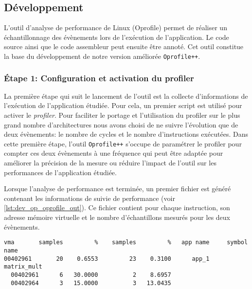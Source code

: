 \subsection{Développement}

    L'outil d'analyse de performance de Linux (Oprofile) permet de réaliser un échantillonnage des évènements lors de l'exécution de l'application. Le code source ainsi que le code assembleur peut ensuite être annoté. Cet outil constitue la base du développement de notre version améliorée \verb=Oprofile++=.
    
    \subsubsection{Étape 1: Configuration et activation du profiler}
        
        La première étape qui suit le lancement de l'outil est la collecte d'informations de l'exécution de l'application étudiée. Pour cela, un premier script est utilisé pour activer le \textit{profiler}. Pour faciliter le portage et l'utilisation du profiler sur le plus grand nombre d'architectures nous avons choisi de ne suivre l'évolution que de deux évènements: le nombre de cycles et le nombre d'instructions exécutées. Dans cette première étape, l'outil \verb=Oprofile++= s'occupe de paramétrer le profiler pour compter ces deux évènements à une fréquence qui peut être adaptée pour améliorer la précision de la mesure ou réduire l'impact de l'outil sur les performances de l'application étudiée. 

        Lorsque l'analyse de performance est terminée, un premier fichier est généré contenant les informations de suivie de performance (voir \autoref{lst:dev_op_oprofile_out}). Ce fichier contient pour chaque instruction, son adresse mémoire virtuelle et le nombre d'échantillons mesurés pour les deux évènements. 
        
\begin{lstlisting}[label=lst:dev_op_oprofile_out, caption=Le premier fichier contient les données de performance pour les deux évènements étudiés.]
vma       samples         %    samples         %   app name     symbol name
00402961       20    0.6553         23    0.3100      app_1     matrix_mult
  00402961      6   30.0000          2    8.6957
  00402964      3   15.0000          3   13.0435
\end{lstlisting}   
  
